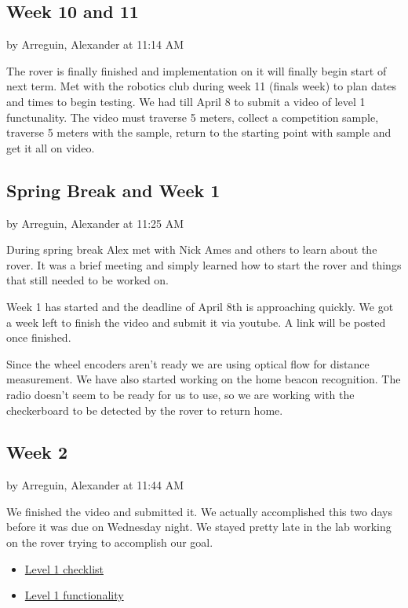 \documentclass[10pt, oneside,onecolumn]{IEEEtran}
\begin{document}
\subsection{Week 10 and 11}
by Arreguin, Alexander at 11:14 AM

The rover is finally finished and implementation on it will finally begin start of next term. Met with the robotics club during week 11 (finals week) to plan dates and times to begin testing. We had till April 8 to submit a video of level 1 functunality. The video must traverse 5 meters, collect a competition sample, traverse 5 meters with the sample, return to the starting point with sample and get it all on video. 

\subsection{Spring Break and Week 1}
by Arreguin, Alexander at 11:25 AM

During spring break Alex met with Nick Ames and others to learn about the rover. It was a brief meeting and simply learned how to start the rover and things that still needed to be worked on. 

Week 1 has started and the deadline of April 8th is approaching quickly. We got a week left to finish the video and submit it via youtube. A link will be posted once finished.

Since the wheel encoders aren't ready we are using optical flow for distance measurement. We have also started working on the home beacon recognition. The radio doesn't seem to be ready for us to use, so we are working with the checkerboard to be detected by the rover to return home. 

\subsection{Week 2}
by Arreguin, Alexander at 11:44 AM

We finished the video and submitted it. We actually accomplished this two days before it was due on Wednesday night. We stayed pretty late in the lab working on the rover trying to accomplish our goal.  

\begin{itemize}
\item \href{https://drive.google.com/open?id=1lH9-26Qdjt1_Ppa7h6n0BpqmCCp4h-UH45eNqOTPJ3U}
{Level 1 checklist}

\item \href{https://www.youtube.com/watch?v=H8sDekAOodg}
{ Level 1 functionality}
\end{itemize}
\end{document}
